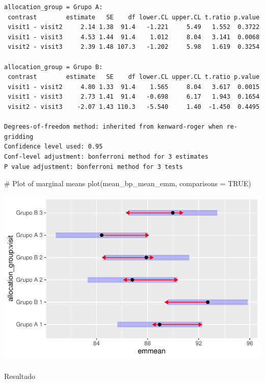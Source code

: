 \documentclass[
  12pt,
]{article}
\makeatletter
\let\oldparagraph\paragraph
\renewcommand{\paragraph}{
    \@ifstar
      \xxxParagraphStar
      \xxxParagraphNoStar
  }
\newcommand{\xxxParagraphStar}[1]{\oldparagraph*{#1}\mbox{}}
\newcommand{\xxxParagraphNoStar}[1]{\oldparagraph{#1}\mbox{}}
\newenvironment{Shaded}{\begin{snugshade}}{\end{snugshade}}
\newcommand{\AttributeTok}[1]{\textcolor[rgb]{0.40,0.45,0.13}{#1}}
\newcommand{\CommentTok}[1]{\textcolor[rgb]{0.37,0.37,0.37}{#1}}
\newcommand{\ConstantTok}[1]{\textcolor[rgb]{0.56,0.35,0.01}{#1}}
\newcommand{\FunctionTok}[1]{\textcolor[rgb]{0.28,0.35,0.67}{#1}}
\newcommand{\NormalTok}[1]{\textcolor[rgb]{0.00,0.23,0.31}{#1}}
\makeatother
\begin{document}
\begin{verbatim}
allocation_group = Grupo A:
 contrast        estimate   SE    df lower.CL upper.CL t.ratio p.value
 visit1 - visit2     2.14 1.38  91.4   -1.221     5.49   1.552  0.3722
 visit1 - visit3     4.53 1.44  91.4    1.012     8.04   3.141  0.0068
 visit2 - visit3     2.39 1.48 107.3   -1.202     5.98   1.619  0.3254

allocation_group = Grupo B:
 contrast        estimate   SE    df lower.CL upper.CL t.ratio p.value
 visit1 - visit2     4.80 1.33  91.4    1.565     8.04   3.617  0.0015
 visit1 - visit3     2.73 1.41  91.4   -0.698     6.17   1.943  0.1654
 visit2 - visit3    -2.07 1.43 110.3   -5.540     1.40  -1.450  0.4495

Degrees-of-freedom method: inherited from kenward-roger when re-gridding 
Confidence level used: 0.95 
Conf-level adjustment: bonferroni method for 3 estimates 
P value adjustment: bonferroni method for 3 tests 
\end{verbatim}

\begin{Shaded}
\begin{Highlighting}[]
\CommentTok{\# Plot of marginal means}
\FunctionTok{plot}\NormalTok{(mean\_bp\_mean\_emm, }\AttributeTok{comparisons =} \ConstantTok{TRUE}\NormalTok{)}
\end{Highlighting}
\end{Shaded}

\includegraphics{Outcomes_files/figure-pdf/mean_bp_mean_sens_emm-1.pdf}

\paragraph{Resultado}\label{resultado-15}
\end{document}
